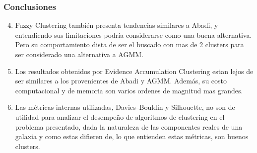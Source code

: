 \begin{frame}
\frametitle{Conclusiones}

\begin{enumerate}
    \setcounter{enumi}{3}
    \item<1-> Fuzzy Clustering también presenta tendencias similares a Abadi, y entendiendo sus limitaciones podría considerarse como una buena alternativa. Pero su comportamiento dista de ser el buscado con mas de 2 clusters para ser considerado una alternativa a AGMM.
    \item<2-> Los resultados obtenidos por Evidence Accumulation Clustering estan lejos de ser similares a los provenientes de Abadi y AGMM. Además, su costo computacional y de memoria son varios ordenes de magnitud mas grandes.
    \item<3-> Las métricas internas utilizadas, Davies–Bouldin y Silhouette, no son de utilidad para analizar el desempeño de algoritmos de clustering en el problema presentado, dada la naturaleza de las componentes reales de una galaxia y como estas difieren de, lo que entienden estas métricas, son buenos clusters.
\end{enumerate}


\end{frame}





